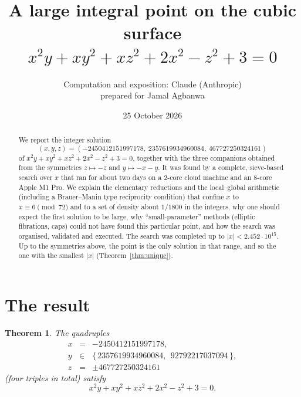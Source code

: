 \documentclass[11pt]{article}
\title{A large integral point on the cubic surface\\[2pt]
$x^2y+xy^2+xz^2+2x^2-z^2+3=0$}
\author{Computation and exposition: Claude (Anthropic)\\ prepared for Jamal Agbanwa}
\date{25 October 2026}
\newtheorem{theorem}{Theorem}
\theoremstyle{remark}
\theoremstyle{definition}
\begin{document}
\maketitle

\begin{abstract}
We report the integer solution
\[
(x,y,z)=(-2450412151997178,\ 2357619934960084,\ 467727250324161)
\]
of $x^2y+xy^2+xz^2+2x^2-z^2+3=0$, together with the three companions obtained from the
symmetries $z\mapsto -z$ and $y\mapsto -x-y$.  It was found by a complete, sieve-based search over
$x$ that ran for about two days on a 2-core cloud machine and an 8-core Apple M1 Pro.  We explain
the elementary reductions and the local--global arithmetic (including a Brauer--Manin type
reciprocity condition) that confine $x$ to $x\equiv 6 \pmod{72}$ and to a set of density
about $1/1800$ in the integers, why one should expect the
first solution to be large, why ``small-parameter'' methods (elliptic fibrations, caps) could
not have found this particular point, and how the search was organised, validated and
executed.  The search was completed up to $|x|<2.452\cdot10^{15}$.  Up to the symmetries above,
the point is the only solution in that range, and so the one with the smallest $|x|$
(Theorem~\ref{thm:unique}).
\end{abstract}

\tableofcontents

\section{The result}

\begin{theorem}\label{thm:main}
The quadruples
\[
\begin{array}{rcl}
x&=&-2450412151997178,\\
y&\in&\{\,2357619934960084,\ \ 92792217037094\,\},\\
z&=&\pm 467727250324161
\end{array}
\]
(four triples in total) satisfy
\begin{equation}\label{eq:main}
x^2y+xy^2+xz^2+2x^2-z^2+3=0 .
\end{equation}
\end{theorem}
\end{document}
